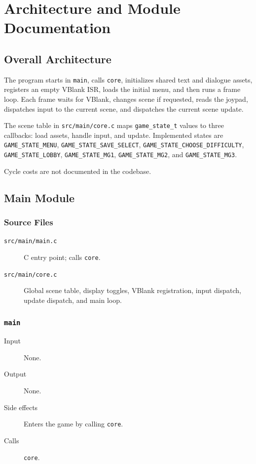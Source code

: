 \chapter{Architecture and Module Documentation}

\section{Overall Architecture}

The program starts in \texttt{main}, calls \texttt{core}, initializes shared text and dialogue assets, registers an empty VBlank ISR, loads the initial menu, and then runs a frame loop. Each frame waits for VBlank, changes scene if requested, reads the joypad, dispatches input to the current scene, and dispatches the current scene update.

The scene table in \texttt{src/main/core.c} maps \texttt{game\_state\_t} values to three callbacks: load assets, handle input, and update. Implemented states are \texttt{GAME\_STATE\_MENU}, \texttt{GAME\_STATE\_SAVE\_SELECT}, \texttt{GAME\_STATE\_CHOOSE\_DIFFICULTY}, \texttt{GAME\_STATE\_LOBBY}, \texttt{GAME\_STATE\_MG1}, \texttt{GAME\_STATE\_MG2}, and \texttt{GAME\_STATE\_MG3}.

Cycle costs are not documented in the codebase.

\section{Main Module}

\subsection{Source Files}

\begin{description}
  \item[\texttt{src/main/main.c}] C entry point; calls \texttt{core}.
  \item[\texttt{src/main/core.c}] Global scene table, display toggles, VBlank registration, input dispatch, update dispatch, and main loop.
\end{description}

\subsection*{\texttt{main}}
\begin{description}
  \item[Input] None.
  \item[Output] None.
  \item[Side effects] Enters the game by calling \texttt{core}.
  \item[Calls] \texttt{core}.
\end{description}

